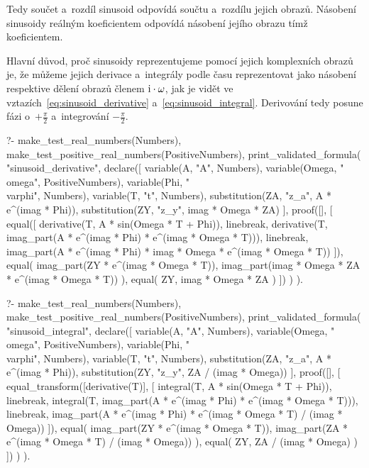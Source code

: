 Tedy součet a~rozdíl sinusoid odpovídá součtu a~rozdílu jejich obrazů. Násobení sinusoidy reálným koeficientem odpovídá násobení jejího obrazu tímž koeficientem.

Hlavní důvod, proč sinusoidy reprezentujeme pomocí jejich komplexních obrazů je, že můžeme jejich derivace a~integrály podle času reprezentovat jako násobení respektive dělení obrazů členem \(\mathrm{i} \cdot \omega\), jak je vidět ve vztazích~\eqref{eq:sinusoid_derivative} a~\eqref{eq:sinusoid_integral}. Derivování tedy posune fázi o~\(+\frac{\pi}{2}\) a~integrování \(-\frac{\pi}{2}\).

\begin{prolog}
?-	make_test_real_numbers(Numbers),
	make_test_positive_real_numbers(PositiveNumbers),
	print_validated_formula(
		"sinusoid_derivative",
		declare([
			variable(A, "A", Numbers),
			variable(Omega, "\\omega", PositiveNumbers),
			variable(Phi, "\\varphi", Numbers),
			variable(T, "t", Numbers),
			substitution(ZA, "z_a", A * e^(imag * Phi)),
			substitution(ZY, "z_y", imag * Omega * ZA)
		],
			proof([],
			[
				equal([
					derivative(T, A * sin(Omega * T + Phi)),
					linebreak,
					derivative(T, imag_part(A * e^(imag * Phi) * e^(imag * Omega * T))),
					linebreak,
					imag_part(A * e^(imag * Phi) * imag * Omega * e^(imag * Omega * T))
				]),
				equal(
					imag_part(ZY * e^(imag * Omega * T)),
					imag_part(imag * Omega * ZA * e^(imag * Omega * T))
				),
				equal(
					ZY,
					imag * Omega * ZA
				)
			])
		)
	).
\end{prolog}


\begin{prolog}
?-	make_test_real_numbers(Numbers),
	make_test_positive_real_numbers(PositiveNumbers),
	print_validated_formula(
		"sinusoid_integral",
		declare([
			variable(A, "A", Numbers),
			variable(Omega, "\\omega", PositiveNumbers),
			variable(Phi, "\\varphi", Numbers),
			variable(T, "t", Numbers),
			substitution(ZA, "z_a", A * e^(imag * Phi)),
			substitution(ZY, "z_y", ZA / (imag * Omega))
		],
			proof([],
			[
				equal_transform([derivative(T)], [
					integral(T, A * sin(Omega * T + Phi)),
					linebreak,
					integral(T, imag_part(A * e^(imag * Phi) * e^(imag * Omega * T))),
					linebreak,
					imag_part(A * e^(imag * Phi) * e^(imag * Omega * T) / (imag * Omega))
				]),
				equal(
					imag_part(ZY * e^(imag * Omega * T)),
					imag_part(ZA * e^(imag * Omega * T) / (imag * Omega))
				),
				equal(
					ZY,
					ZA / (imag * Omega)
				)
			])
		)
	).
\end{prolog}

